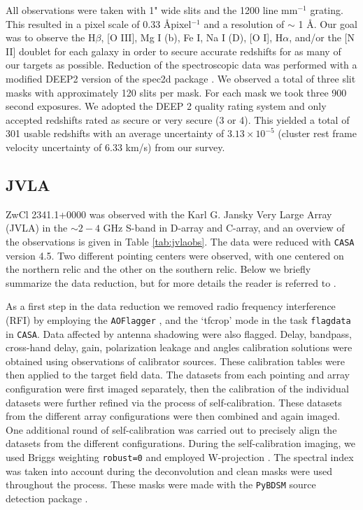 \documentclass[onecolumn]{aastex}
\begin{document}
All observations were taken with 1" wide slits and the 1200 line mm$^{-1}$ grating.  This resulted in a pixel scale of 0.33 \AA pixel$^{-1}$ and a resolution of $\sim$ 1 \AA.  Our goal was to observe the H$\beta$, [O III], Mg I (b), Fe I, Na I (D), [O I], H$\alpha$, and/or the [N II] doublet for each galaxy in order to secure accurate redshifts for as many of our targets as possible.  Reduction of the spectroscopic data was performed with a modified DEEP2 version of the spec2d package \citep{Newman13}.  We observed a total of three slit masks with approximately 120 slits per mask.  For each mask we took three 900 second exposures.  We adopted the DEEP 2 quality rating system \citep{Newman13} and only accepted redshifts rated as secure or very secure (3 or 4).  This yielded a total of 301 usable redshifts with an average uncertainty of $3.13 \times10^{-5}$ (cluster rest frame velocity uncertainty of 6.33 km/s) from our survey.

\subsection{JVLA}
ZwCl 2341.1+0000 was observed with the Karl G. Jansky Very Large Array (JVLA) in the $\sim2-4$ GHz S-band in D-array and C-array, and an overview of the observations is given in Table \ref{tab:jvlaobs}.  The data were reduced with {\tt CASA} \citep{McMullin07} version 4.5.  Two different pointing centers were observed, with one centered on the northern relic and the other on the southern relic.  Below we briefly summarize the data reduction, but for more details the reader is referred to \cite{vanWeeren16}.

As a first step in the data reduction we removed radio frequency interference (RFI) by employing the {\tt AOFlagger} \citep{Offringa10}, and the `tfcrop' mode in the task {\tt flagdata} in {\tt CASA}.  Data affected by antenna shadowing were also flagged.  Delay, bandpass, cross-hand delay, gain, polarization leakage and angles calibration solutions were obtained using observations of calibrator sources.  These calibration tables were then applied to the target field data.  The datasets from each pointing and array configuration were first imaged separately, then the calibration of the individual datasets were further refined via the process of self-calibration.  These datasets from the different array configurations were then combined and again imaged.  One additional round of self-calibration was carried out to precisely align the datasets from the different configurations.  During the self-calibration imaging, we used Briggs weighting {\tt robust=0} and employed W-projection \citep{Cornwell08, Cornwell05}.  The spectral index was taken into account during the deconvolution \citep{Rau11} and clean masks were used throughout the process.  These masks were made with the {\tt PyBDSM} source detection package \citep{Mohan15}.
\end{document}
